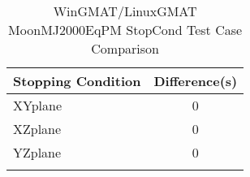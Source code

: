 \begin{table}[htbp!]
\centering
\caption{ WinGMAT/LinuxGMAT MoonMJ2000EqPM StopCond Test Case Comparison}
      \begin{tabular}{lc}
      \hline\hline
          Stopping Condition & Difference(s) \\
         \hline
         XYplane & 0 \\
         XZplane & 0 \\
         YZplane & 0 \\
      \hline\hline
      \label{Table: WinGMAT-LinuxGMAT MoonMJ2000EqPM StopCond Table} 
\end{tabular}
\end{table}
